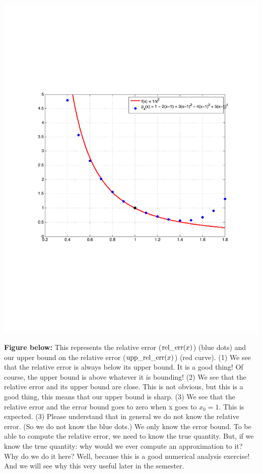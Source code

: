 \documentclass[pdftex,11pt]{article}
\begin{document}
\includegraphics[width=.7\textwidth]{EX_0_5_6_fig1}

\textbf{Figure below:} This represents the relative error
($\textmd{rel\_err}(x)$) (blue dots) and our upper bound on the relative error
($\textmd{upp\_rel\_err}(x)$) (red curve). (1) We see that the relative error
is always below its upper bound. It is a good thing! Of course, the upper bound
is above whatever it is bounding! (2) We see that the relative error and its
upper bound are close. This is not obvious, but this is a good thing, this
means that our upper bound is sharp.  (3) We see that the relative error and
the error bound goes to zero when x goes to $x_0=1$. This is expected.  (3)
Please understand that in general we do not know the relative error.  (So we do
not know the blue dots.) We only know the error bound. To be able to compute
the relative error, we need to know the true quantity. But, if we know the true
quantity: why would we ever compute an approximation to it?  Why do we do it
here? Well, because this is a good numerical analysis exercise! And we will see
why this very useful later in the semester.
\end{document}
